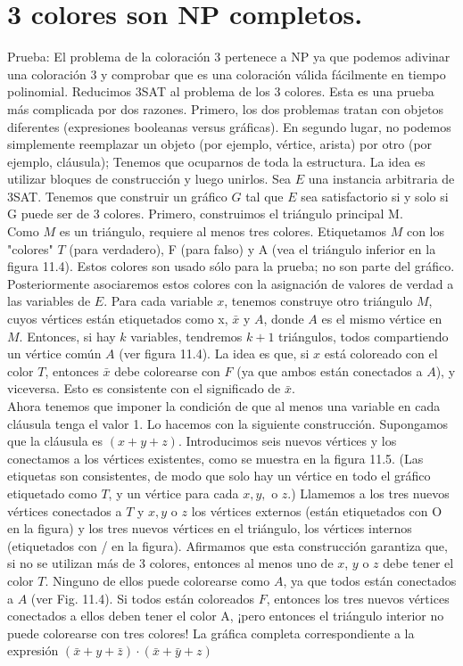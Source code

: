 \section{3 colores son NP completos.}

Prueba: El problema de la coloración 3 pertenece a NP ya que podemos adivinar una coloración 3 y 
comprobar que es una coloración válida fácilmente en tiempo polinomial. Reducimos 3SAT al 
problema de los 3 colores. Esta es una prueba más complicada por dos razones. Primero, los dos
problemas tratan con objetos diferentes (expresiones booleanas versus gráficas). En segundo lugar, 
no podemos simplemente reemplazar un objeto (por ejemplo, vértice, arista) por otro (por 
ejemplo, cláusula); Tenemos que ocuparnos de toda la estructura. La idea es utilizar bloques de 
construcción y luego unirlos. Sea $E$ una instancia arbitraria de 3SAT. Tenemos que construir un 
gráfico $G$ tal que $E$ sea satisfactorio si y solo si G puede ser de 3 colores. Primero, 
construimos el triángulo principal M.\\ 

Como $M$ es un triángulo, requiere al menos tres colores. Etiquetamos $M$ con los "colores" $T$ 
(para verdadero), F (para falso) y A (vea el triángulo inferior en la figura 11.4). Estos colores son
usado sólo para la prueba; no son parte del gráfico. Posteriormente asociaremos estos colores con 
la asignación de valores de verdad a las variables de $E$. Para cada variable $x$, tenemos construye 
otro triángulo $M$, cuyos vértices están etiquetados como x, $\bar{x}$ y $A$, donde $A$ es el mismo 
vértice en $M$. Entonces, si hay $k$ variables, tendremos $k + 1$ triángulos, todos compartiendo un 
vértice común $A$ (ver figura 11.4). La idea es que, si $x$ está coloreado con el color $T$, entonces 
$\bar{x}$ debe colorearse con $F$ (ya que ambos están conectados a $A$), y viceversa. Esto es 
consistente con el significado de $\bar{x}$. \\ 

Ahora tenemos que imponer la condición de que al menos una variable en cada cláusula tenga el valor 1. 
Lo hacemos con la siguiente construcción. Supongamos que la cláusula es $(x + y + z)$. Introducimos 
seis nuevos vértices y los conectamos a los vértices existentes, como se muestra en la figura 11.5. 
(Las etiquetas son consistentes, de modo que solo hay un vértice en todo el gráfico etiquetado como 
$T$, y un vértice para cada $x, y,$ o $z$.) Llamemos a los tres nuevos vértices conectados a $T$ y 
$ x, y$ o $z$ los vértices externos (están etiquetados con O en la figura) y los tres nuevos vértices 
en el triángulo, los vértices internos (etiquetados con / en la figura). Afirmamos que esta 
construcción garantiza que, si no se utilizan más de 3 colores, entonces al menos uno de $x$, $y$ o $z$ 
debe tener el color $T$. Ninguno de ellos puede colorearse como $A$, ya que todos están conectados a $A$ 
(ver Fig. 11.4). Si todos están coloreados $F$, entonces los tres nuevos vértices conectados a ellos 
deben tener el color A, ¡pero entonces el triángulo interior no puede colorearse con tres colores! La 
gráfica completa correspondiente a la expresión $(\bar{x} + y + \bar{z}) \cdot (\bar{x} + \bar{y} + z)$\\ 

